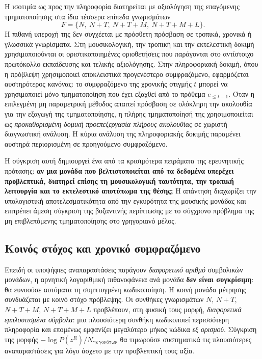 \documentclass[11pt,a4paper]{article}
\begin{document}
Η ισοτιμία ως προς την πληροφορία διατηρείται με αξιολόγηση της επαγόμενης τμηματοποίησης στα ίδια τέσσερα επίπεδα γνωρισμάτων
\[
F=\{N,\ N{+}T,\ N{+}T{+}M,\ N{+}T{+}M{+}L\}.
\]
Η πιθανή υπεροχή της δεν συγχέεται με πρόσθετη πρόσβαση σε τροπικά, χρονικά ή γλωσσικά γνωρίσματα. Στη μουσικολογική, την τροπική και την εκτελεστική δοκιμή χρησιμοποιούνται οι οριστικοποιημένες οριοθετήσεις που παράγονται στο αντίστοιχο πρωτόκολλο εκπαίδευσης και τελικής αξιολόγησης. Στην πληροφοριακή δοκιμή, όπου η πρόβλεψη χρησιμοποιεί αποκλειστικά προγενέστερο συμφραζόμενο, εφαρμόζεται αυστηρότερος κανόνας: το συμφραζόμενο της χρονικής στιγμής \(t\) μπορεί να χρησιμοποιεί μόνο τμηματοποίηση που έχει εξαχθεί από το πρόθεμα \(e_{\leq t-1}\). Όταν η επιλεγμένη μη παραμετρική μέθοδος απαιτεί πρόσβαση σε ολόκληρη την ακολουθία για την εξαγωγή της τμηματοποίησης, η πλήρης τμηματοποίησή της χρησιμοποιείται ως \emph{προκαθορισμένη δομική προεπεξεργασία πλήρους ακολουθίας} σε χωριστή διαγνωστική ανάλυση. Η κύρια ανάλυση της πληροφοριακής δοκιμής παραμένει αυστηρά περιορισμένη σε προηγούμενο συμφραζόμενο.

Η σύγκριση αυτή δημιουργεί ένα από τα κρισιμότερα πειράματα της ερευνητικής πρότασης: \textbf{αν μια μονάδα που βελτιστοποιείται από τα δεδομένα υπερέχει προβλεπτικά, διατηρεί επίσης τη μουσικολογική ταυτότητα, την τροπική λειτουργία και το εκτελεστικό αποτύπωμα της θέσης;} Η απάντηση διαχωρίζει την υπολογιστική αποτελεσματικότητα από την εγκυρότητα της μουσικής μονάδας και επιτρέπει άμεση σύγκριση της βυζαντινής περίπτωσης με το σύγχρονο πρόβλημα της μη επιβλεπόμενης τμηματοποίησης στο γρηγοριανό μέλος.

\subsection{Κοινός στόχος και χρονικό συμφραζόμενο}\label{app:repr-common-target}

Επειδή οι υποψήφιες αναπαραστάσεις παράγουν \emph{διαφορετικό αριθμό} συμβολικών μονάδων, η αρνητική λογαριθμική πιθανοφάνεια ανά μονάδα \textbf{δεν είναι συγκρίσιμη}: θα ευνοούσε αυτόματα τη συμπτυγμένη κωδικοποίηση. Η κοινή μονάδα μέτρησης συνδυάζεται με κοινό στόχο πρόβλεψης. Οι συνθήκες γνωρισμάτων \(N\), \(N{+}T\), \(N{+}T{+}M\), \(N{+}T{+}M{+}L\) προβλέπουν, στη φυσική τους μορφή, \emph{διαφορετικά εμπλουτισμένα σύμβολα}: μια πλουσιότερη συνθήκη κωδικοποιεί περισσότερη πληροφορία και επομένως εμφανίζει μεγαλύτερο μήκος κώδικα \emph{εξ ορισμού}. Σύγκριση της μορφής \(-\log P(z^R)/N_{\text{γεγονότων}}\) θα τιμωρούσε συστηματικά τις πλουσιότερες αναπαραστάσεις για λόγο άσχετο με την προβλεπτική τους αξία.
\end{document}
